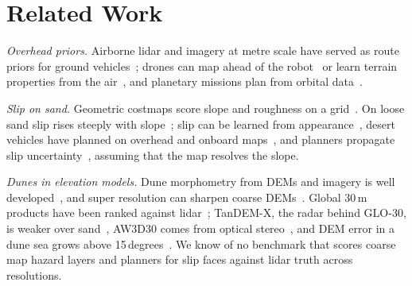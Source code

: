\section{Related Work}
\textit{Overhead priors.} Airborne lidar and imagery at metre scale have served as route priors for ground vehicles~\cite{vandapel2006aerial}; drones can map ahead of the robot~\cite{delmerico2017active} or learn terrain properties from the air~\cite{fortin2025uav}, and planetary missions plan from orbital data~\cite{ono2016traversability}.

\textit{Slip on sand.} Geometric costmaps score slope and roughness on a grid~\cite{papadakis2013,goldberg2002}. On loose sand slip rises steeply with slope~\cite{ishigami2007,heverly2013,shrivastava2020}; slip can be learned from appearance~\cite{angelova2007slip}, desert vehicles have planned on overhead and onboard maps~\cite{thrun2006stanley}, and planners propagate slip uncertainty~\cite{inotsume2020robust}, assuming that the map resolves the slope.

\textit{Dunes in elevation models.} Dune morphometry from DEMs and imagery is well developed~\cite{hugenholtz2012remote,daynac2024workflow}, and super resolution can sharpen coarse DEMs~\cite{chen2016demsr}. Global 30\,m products have been ranked against lidar~\cite{guth2021ranking}; TanDEM-X, the radar behind GLO-30, is weaker over sand~\cite{martone2016enhancing}, AW3D30 comes from optical stereo~\cite{tadono2014aw3d}, and DEM error in a dune sea grows above 15\,degrees~\cite{wang2025multisource}. We know of no benchmark that scores coarse map hazard layers and planners for slip faces against lidar truth across resolutions.
